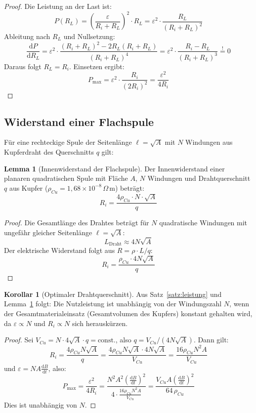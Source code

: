 ﻿\documentclass[a4paper,12pt]{article}
\theoremstyle{definition}
\newtheorem{lemma}{Lemma}
\newtheorem{korollar}{Korollar}
\begin{document}
\begin{proof}
    Die Leistung an der Last ist:
    \[
        P(R_L) = \left(\frac{\varepsilon}{R_i + R_L}\right)^2 \cdot R_L
        = \varepsilon^2 \cdot \frac{R_L}{(R_i + R_L)^2}
    \]
    Ableitung nach $R_L$ und Nullsetzung:
    \[
        \frac{\mathrm{d}P}{\mathrm{d}R_L}
        = \varepsilon^2 \cdot \frac{(R_i + R_L)^2 - 2R_L(R_i+R_L)}{(R_i+R_L)^4}
        = \varepsilon^2 \cdot \frac{R_i - R_L}{(R_i+R_L)^3} \overset{!}{=} 0
    \]
    Daraus folgt $R_L = R_i$. Einsetzen ergibt:
    \[
        P_{\max} = \varepsilon^2 \cdot \frac{R_i}{(2R_i)^2} = \frac{\varepsilon^2}{4R_i}
    \]
\end{proof}

\subsection{Widerstand einer Flachspule}

F\"ur eine rechteckige Spule der Seitenl\"ange $\ell = \sqrt{A}$ mit $N$ Windungen
aus Kupferdraht des Querschnitts $q$ gilt:

\begin{lemma}[Innenwiderstand der Flachspule]
\label{lem:widerstand}
    Der Innenwiderstand einer planaren quadratischen Spule mit Fl\"ache $A$,
    $N$ Windungen und Drahtquerschnitt $q$ aus Kupfer
    ($\rho_{Cu} = 1{,}68 \times 10^{-8}\,\Omega\,\mathrm{m}$) betr\"agt:
    \[
        R_i = \frac{4 \rho_{Cu} \cdot N \cdot \sqrt{A}}{q}
    \]
\end{lemma}

\begin{proof}
    Die Gesamtl\"ange des Drahtes betr\"agt f\"ur $N$ quadratische Windungen
    mit ungef\"ahr gleicher Seitenl\"ange $\ell = \sqrt{A}$:
    \[
        L_{\text{Draht}} \approx 4N\sqrt{A}
    \]
    Der elektrische Widerstand folgt aus $R = \rho \cdot L / q$:
    \[
        R_i = \frac{\rho_{Cu} \cdot 4N\sqrt{A}}{q}
    \]
\end{proof}

\begin{korollar}[Optimaler Drahtquerschnitt]
    Aus Satz~\ref{satz:leistung} und Lemma~\ref{lem:widerstand} folgt:
    Die Nutzleistung ist unabh\"angig von der Windungszahl $N$, wenn
    der Gesamtmaterialeinsatz (Gesamtvolumen des Kupfers) konstant gehalten wird,
    da $\varepsilon \propto N$ und $R_i \propto N$ sich herausk\"urzen.
\end{korollar}

\begin{proof}
    Sei $V_{Cu} = N \cdot 4\sqrt{A} \cdot q = \text{const.}$, also $q = V_{Cu}/(4N\sqrt{A})$.
    Dann gilt:
    \[
        R_i = \frac{4\rho_{Cu} N \sqrt{A}}{q}
        = \frac{4\rho_{Cu} N \sqrt{A} \cdot 4N\sqrt{A}}{V_{Cu}}
        = \frac{16\rho_{Cu} N^2 A}{V_{Cu}}
    \]
    und $\varepsilon = N A \tfrac{\mathrm{d}B}{\mathrm{d}t}$, also:
    \[
        P_{\max} = \frac{\varepsilon^2}{4R_i}
        = \frac{N^2 A^2 \left(\tfrac{\mathrm{d}B}{\mathrm{d}t}\right)^2}{4 \cdot \frac{16\rho_{Cu}N^2 A}{V_{Cu}}}
        = \frac{V_{Cu} A \left(\tfrac{\mathrm{d}B}{\mathrm{d}t}\right)^2}{64\,\rho_{Cu}}
    \]
    Dies ist unabh\"angig von $N$.
\end{proof}
\end{document}
